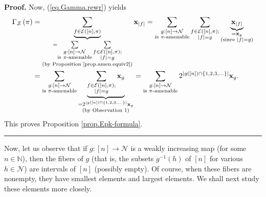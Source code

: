 \documentclass[numbers=enddot,12pt,final,onecolumn,notitlepage]{scrartcl}%
\theoremstyle{definition}
\newenvironment{proof}[1][Proof]{\noindent\textbf{#1.} }{\ \rule{0.5em}{0.5em}}
\newenvironment{verlong}{}{}
\let\sumnonlimits\sum
\renewcommand{\sum}{\sumnonlimits\limits}
\begin{document}
\begin{verlong}
\begin{proof}
Now, (\ref{eq.Gamma.rewr}) yields%
\begin{align*}
\Gamma_{\mathcal{Z}}\left(  \pi\right)   &  =\underbrace{\sum_{f\in
\mathcal{E}\left(  \left[  n\right]  ,\pi\right)  }}_{\substack{=\sum
_{\substack{g:\left[  n\right]  \rightarrow\mathcal{N}\\\text{is }%
\pi\text{-amenable}}}\sum_{\substack{f\in\mathcal{E}\left(  \left[  n\right]
,\pi\right)  ;\\\left\vert f\right\vert =g}}\\\text{(by Proposition
\ref{prop.amen.equiv2})}}}\mathbf{x}_{\left\vert f\right\vert }=\sum
_{\substack{g:\left[  n\right]  \rightarrow\mathcal{N}\\\text{is }%
\pi\text{-amenable}}}\sum_{\substack{f\in\mathcal{E}\left(  \left[  n\right]
,\pi\right)  ;\\\left\vert f\right\vert =g}}\underbrace{\mathbf{x}_{\left\vert
f\right\vert }}_{\substack{=\mathbf{x}_{g}\\\text{(since }\left\vert
f\right\vert =g\text{)}}}\\
&  =\sum_{\substack{g:\left[  n\right]  \rightarrow\mathcal{N}\\\text{is }%
\pi\text{-amenable}}}\underbrace{\sum_{\substack{f\in\mathcal{E}\left(
\left[  n\right]  ,\pi\right)  ;\\\left\vert f\right\vert =g}}\mathbf{x}_{g}%
}_{\substack{=2^{\left\vert g\left(  \left[  n\right]  \right)  \cap\left\{
1,2,3,\ldots\right\}  \right\vert }\mathbf{x}_{g}\\\text{(by Observation 1)}%
}}=\sum_{\substack{g:\left[  n\right]  \rightarrow\mathcal{N}\\\text{is }%
\pi\text{-amenable}}}2^{\left\vert g\left(  \left[  n\right]  \right)
\cap\left\{  1,2,3,\ldots\right\}  \right\vert }\mathbf{x}_{g}.
\end{align*}
This proves Proposition \ref{prop.Epk-formula}.
\end{proof}
\end{verlong}

Now, let us observe that if $g:\left[  n\right]  \rightarrow\mathcal{N}$ is a
weakly increasing map (for some $n\in\mathbb{N}$), then the fibers of $g$
(that is, the subsets $g^{-1}\left(  h\right)  $ of $\left[  n\right]  $ for
various $h\in\mathcal{N}$) are intervals of $\left[  n\right]  $ (possibly
empty). Of course, when these fibers are nonempty, they have smallest elements
and largest elements. We shall next study these elements more closely.
\end{document}
